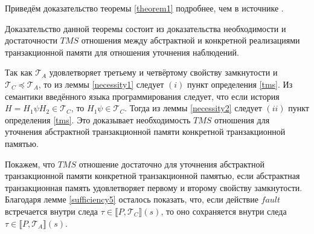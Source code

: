 Приведём доказательство теоремы \ref{theorem1} подробнее, чем в источнике \cite{tms_article}.
\begin{mproof}
Доказательство данной теоремы состоит из доказательства необходимости и достаточности $TMS$ отношения между абстрактной и конкретной реализациями транзакционной памяти для отношения уточнения наблюдений.

Так как $\mathcal{T}_A$ удовлетворяет третьему и четвёртому свойству замкнутости и $\mathcal{T}_C \preceq \mathcal{T}_A$, то из леммы \ref{necessity1} следует $(i)$ пункт определения \ref{tms}. Из семантики введённого языка программирования следует, что если история $H = H_1\psi{H_2} \in \mathcal{T}_C$, то $H_1\psi \in \mathcal{T}_C$. Тогда из леммы \ref{necessity2} следует $(ii)$ пункт определения \ref{tms}. 
Это доказывает необходимость $TMS$ отношения для уточнения абстрактной транзакционной памяти конкретной транзакционной памятью.

Покажем, что $TMS$ отношение достаточно для уточнения абстрактной транзакционной памяти конкретной транзакционной памятью, если абстрактная транзакционная память удовлетворяет первому и второму свойству замкнутости. Благодаря лемме \ref{sufficiency5} осталось показать, что, если действие $fault$ встречается внутри следа $\tau \in \llbracket P, \mathcal{T}_C \rrbracket(s)$, то оно сохраняется внутри следа $\tau \in \llbracket P, \mathcal{T}_A \rrbracket(s)$.  


\end{mproof}
